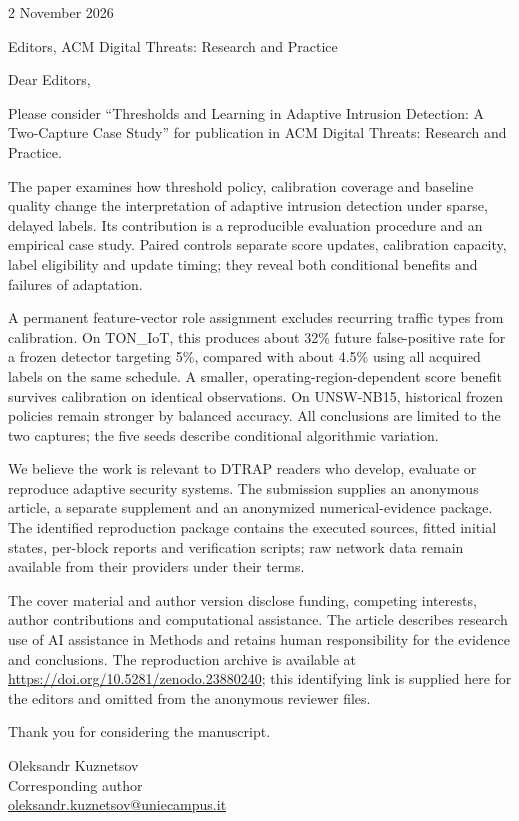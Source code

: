 \documentclass[11pt]{article}
\begin{document}
\begin{flushright}2 November 2026\end{flushright}
Editors, ACM Digital Threats: Research and Practice

Dear Editors,

Please consider ``Thresholds and Learning in Adaptive Intrusion Detection: A Two-Capture Case Study'' for publication in ACM Digital Threats: Research and Practice.

The paper examines how threshold policy, calibration coverage and baseline quality change the interpretation of adaptive intrusion detection under sparse, delayed labels. Its contribution is a reproducible evaluation procedure and an empirical case study. Paired controls separate score updates, calibration capacity, label eligibility and update timing; they reveal both conditional benefits and failures of adaptation.

A permanent feature-vector role assignment excludes recurring traffic types from calibration. On TON\_IoT, this produces about 32\% future false-positive rate for a frozen detector targeting 5\%, compared with about 4.5\% using all acquired labels on the same schedule. A smaller, operating-region-dependent score benefit survives calibration on identical observations. On UNSW-NB15, historical frozen policies remain stronger by balanced accuracy. All conclusions are limited to the two captures; the five seeds describe conditional algorithmic variation.

We believe the work is relevant to DTRAP readers who develop, evaluate or reproduce adaptive security systems. The submission supplies an anonymous article, a separate supplement and an anonymized numerical-evidence package. The identified reproduction package contains the executed sources, fitted initial states, per-block reports and verification scripts; raw network data remain available from their providers under their terms.

The cover material and author version disclose funding, competing interests, author contributions and computational assistance. The article describes research use of AI assistance in Methods and retains human responsibility for the evidence and conclusions. The reproduction archive is available at \url{https://doi.org/10.5281/zenodo.23880240}; this identifying link is supplied here for the editors and omitted from the anonymous reviewer files.

Thank you for considering the manuscript.

Oleksandr Kuznetsov\\
Corresponding author\\
\href{mailto:oleksandr.kuznetsov@uniecampus.it}{oleksandr.kuznetsov@uniecampus.it}
\end{document}
